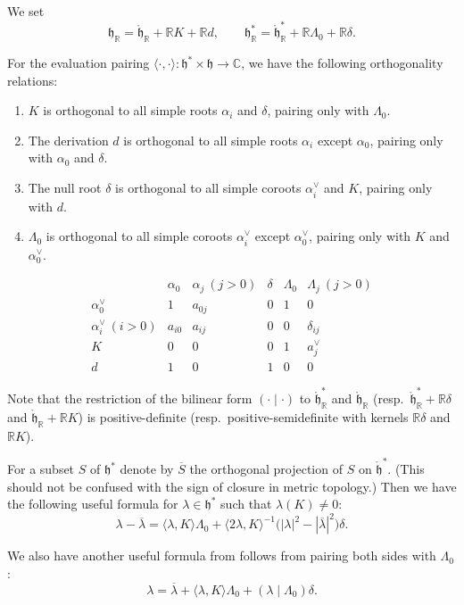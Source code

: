 \documentclass[12pt]{article}
\begin{document}
We set 
\[
\mathfrak{h}_{\mathbb{R}} = \mathring{\mathfrak{h}}_{\mathbb{R}} + \mathbb{R}K + \mathbb{R}d,
\qquad
\mathfrak{h}_{\mathbb{R}}^* = \mathring{\mathfrak{h}}_{\mathbb{R}}^* + \mathbb{R}\Lambda_0 + \mathbb{R}\delta.
\]
\begin{remark} 
    For the evaluation pairing $\langle \cdot, \cdot \rangle : \mathfrak{h}^* \times \mathfrak{h} \to \mathbb{C}$, we have the following orthogonality relations:
    \begin{enumerate}
        \item $K$ is orthogonal to all simple roots $\alpha_i$ and $\delta$, pairing only with $\Lambda_0$. 
        \item The derivation $d$ is orthogonal to all simple roots $\alpha_i$ except $\alpha_0$, pairing only with $\alpha_0$ and $\delta$. 
        \item The null root $\delta$ is orthogonal to all simple coroots $\alpha_i^\vee$ and $K$, pairing only with $d$.
        \item $\Lambda_0$ is orthogonal to all simple coroots $\alpha_i^\vee$ except $\alpha_0^\vee$, pairing only with $K$ and $\alpha_0^\vee$.
    \end{enumerate}
    \[
\begin{array}{c|c|c|c|c|c}
   & \alpha_0 & \alpha_j \ (j>0) & \delta & \Lambda_0 & \Lambda_j \ (j>0) \\ \hline
\alpha_0^\vee & 1 & a_{0j} & 0 & 1 & 0 \\ 
\alpha_i^\vee \ (i>0) & a_{i0} & a_{ij} & 0 & 0 & \delta_{ij} \\
K & 0 & 0 & 0 & 1 & a_j^\vee \\
d & 1 & 0 & 1 & 0 & 0
\end{array}
\]
\end{remark}
Note that the restriction of the bilinear form $(\cdot \mid \cdot)$ to 
$\mathring{\mathfrak{h}}_{\mathbb{R}}^*$ and $\mathring{\mathfrak{h}}_{\mathbb{R}}$ 
(resp.\ $\mathring{\mathfrak{h}}_{\mathbb{R}}^* + \mathbb{R}\delta$ and 
$\mathring{\mathfrak{h}}_{\mathbb{R}} + \mathbb{R}K$) 
is positive-definite (resp.\ positive-semidefinite with kernels $\mathbb{R}\delta$ and $\mathbb{R}K$).


\begin{lemma}\label{lem:affine-formulas}
For a subset $S$ of $\mathfrak{h}^*$ denote by $\overline{S}$ the orthogonal projection of $S$ on $\mathring{\mathfrak{h}}^*$.
(This should not be confused with the sign of closure in metric topology.)
Then we have the following useful formula for $\lambda \in \mathfrak{h}^*$ such that $\lambda(K)\neq 0$:
\begin{equation}
\lambda - \overline{\lambda}
= \langle \lambda, K \rangle \Lambda_0
+ \langle 2\lambda, K \rangle^{-1}\big(|\lambda|^2 - |\overline{\lambda}|^2\big)\delta.
\tag{6.2.6}
\end{equation}

We also have another useful formula from follows from pairing both sides with $\Lambda_0$:
\begin{equation}
\lambda = \overline{\lambda} + \langle \lambda, K \rangle \Lambda_0 + (\lambda \mid \Lambda_0)\delta.
\end{equation}
\end{lemma}
\end{document}

